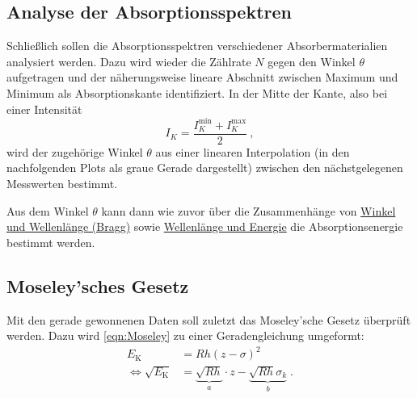 \clearpage
\subsection{Analyse der Absorptionsspektren}
\label{sec:auswertung:absorptionsspektren}

Schließlich sollen die Absorptionsspektren verschiedener Absorbermaterialien analysiert werden.
Dazu wird wieder die Zählrate $N$ gegen den Winkel $\theta$ aufgetragen
und der näherungsweise lineare Abschnitt
zwischen Maximum und Minimum
als Absorptionskante identifiziert.
In der Mitte der Kante,
also bei einer Intensität
\[ I_K = \frac{I_K^\text{min} + I_K^\text{max}}{2} \ , \]
wird der zugehörige Winkel $\theta$
aus einer linearen Interpolation (in den nachfolgenden Plots als graue Gerade dargestellt)
zwischen den nächstgelegenen Messwerten bestimmt.

Aus dem Winkel $\theta$ kann dann wie zuvor
über die Zusammenhänge von
\hyperref[eqn:BraggBedingung]{Winkel und Wellenlänge (Bragg)} sowie
\hyperref[eqn:lambda_to_E]{Wellenlänge und Energie}
die Absorptionsenergie bestimmt werden.



\newpage
\subsection{Moseley'sches Gesetz}
\label{sec:auswertung:moseley}

Mit den gerade gewonnenen Daten soll zuletzt das Moseley'sche Gesetz überprüft werden.
Dazu wird \autoref{eqn:Moseley} zu einer Geradengleichung umgeformt:
\begin{align*}
    E_\text{K} &= R h (z - \sigma)^2 \\
    \Leftrightarrow
    \sqrt{E_\text{K}} &= \underbrace{\sqrt{R h}}_a \cdot z - \underbrace{\sqrt{R h} \sigma_k}_b \; .
\end{align*}

